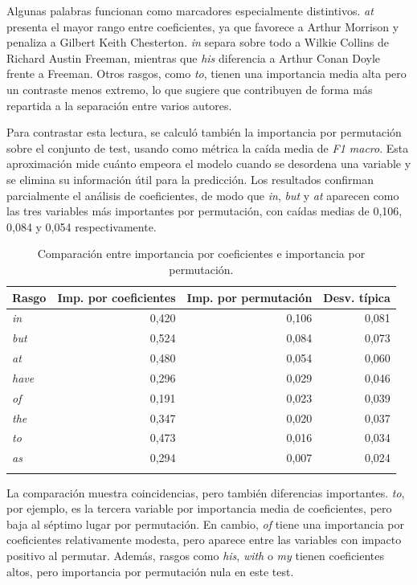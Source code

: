 \documentclass[IB]{TFUOC}%
\begin{document}
Algunas palabras funcionan como marcadores especialmente distintivos. \textit{at} presenta el mayor rango entre coeficientes, ya que favorece a Arthur Morrison y penaliza a Gilbert Keith Chesterton. \textit{in} separa sobre todo a Wilkie Collins de Richard Austin Freeman, mientras que \textit{his} diferencia a Arthur Conan Doyle frente a Freeman. Otros rasgos, como \textit{to}, tienen una importancia media alta pero un contraste menos extremo, lo que sugiere que contribuyen de forma más repartida a la separación entre varios autores.

Para contrastar esta lectura, se calculó también la importancia por permutación sobre el conjunto de test, usando como métrica la caída media de \textit{F1 macro}. Esta aproximación mide cuánto empeora el modelo cuando se desordena una variable y se elimina su información útil para la predicción. Los resultados confirman parcialmente el análisis de coeficientes, de modo que \textit{in}, \textit{but} y \textit{at} aparecen como las tres variables más importantes por permutación, con caídas medias de 0,106, 0,084 y 0,054 respectivamente.

\begin{longtable}{|p{1.3cm}|r|r|r|}
\hline
\textbf{Rasgo} & \textbf{Imp. por coeficientes} & \textbf{Imp. por permutación} & \textbf{Desv. típica} \\
\hline
\textit{in} & 0,420 & 0,106 & 0,081 \\
\hline
\textit{but} & 0,524 & 0,084 & 0,073 \\
\hline
\textit{at} & 0,480 & 0,054 & 0,060 \\
\hline
\textit{have} & 0,296 & 0,029 & 0,046 \\
\hline
\textit{of} & 0,191 & 0,023 & 0,039 \\
\hline
\textit{the} & 0,347 & 0,020 & 0,037 \\
\hline
\textit{to} & 0,473 & 0,016 & 0,034 \\
\hline
\textit{as} & 0,294 & 0,007 & 0,024 \\
\hline
\caption{Comparación entre importancia por coeficientes e importancia por permutación.}
\label{tab:coeficientes-vs-permutacion}
\end{longtable}

La comparación muestra coincidencias, pero también diferencias importantes. \textit{to}, por ejemplo, es la tercera variable por importancia media de coeficientes, pero baja al séptimo lugar por permutación. En cambio, \textit{of} tiene una importancia por coeficientes relativamente modesta, pero aparece entre las variables con impacto positivo al permutar. Además, rasgos como \textit{his}, \textit{with} o \textit{my} tienen coeficientes altos, pero importancia por permutación nula en este test.
\end{document}
